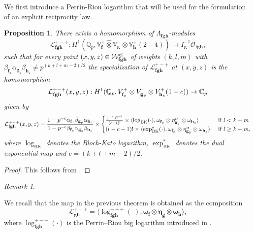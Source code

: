 \documentclass[a4paper,11pt]{amsart}
\theoremstyle{plain}
\newtheorem{propo}[theorem]{Proposition}
\theoremstyle{definition}
\theoremstyle{remark}
\newtheorem{remarkwr}[theorem]{Remark}
\newenvironment{remark}{\begin{remarkwr}\begin{upshape}}{\end{upshape}\end{remarkwr}}
\newcommand{\bb}{\mathbb}
\newcommand{\cl}{\mathcal}
\DeclareMathOperator{\BK}{BK}
\newcommand{\hf}{{\mathbf{f}}}
\newcommand{\hg}{{\mathbf{g}}}
\newcommand{\hh}{{\mathbf h}}
\numberwithin{equation}{section}
\begin{document}
We first introduce a Perrin-Riou logarithm that will be used for the formulation of an explicit reciprocity law. 

\begin{propo}\label{perrin2}
There exists a
homomorphism of $\Lambda_{\hf \hg \hh}$-modules
\[
\mathcal L_{\hf \hg \hh}^{+-+}: H^1(\mathbb Q_p, \bb{V}_\hf^+ \hat{\otimes}\mathbb V_{\hg}^- \hat \otimes \mathbb V_{\hh}^+ (2-\mathbf{t})) \rightarrow I_\hg^{-1} \cl{O}_{\hf \hg \hh },
\]
such that for every point $(x,y,z) \in \mathcal W_{{\bf fgh}}^{\mathrm{cl}}$ of weights $(k,l,m)$ with $\beta_{\hf_x}\alpha_{\hg_y}\beta_{\hh_z}\neq p^{(k+l+m-2)/2}$ the specialization of $\mathcal L_{\hf \hg \hh}^{+-+}$ at $(x,y,z)$ is the homomorphism
\[
\mathcal L_{{\bf fgh}}^{+-+}(x,y,z): H^1(\mathbb Q_p, V_{\hf_x}^+\otimes V_{\hg_y}^- \otimes V_{\hh_z}^+(1-c)) \rightarrow \mathbb C_p
\]
given by
\[
\mathcal L_{{\bf fgh}}^{+-+}(x,y,z) = \frac{1-p^{-c}\alpha_{\hf_x} \beta_{\hg_y}\alpha_{\hh_z}}{1-p^{-c} \beta_{\hf_x} \alpha_{\hg_y} \beta_{\hh_z}} \times \begin{cases} \frac{(-1)^{c-l}}{(c-l)!} \times \langle \log_{\BK}(\cdot), \omega_{\hf_x}\otimes\eta_{\hg_y}^\alpha \otimes \omega_{\hh_z} \rangle & \text{ if } l < k+ m \\ (l-c-1)! \times \langle \exp_{\BK}^*(\cdot), \omega_{\hf_x} \otimes\eta_{\hg_y}^\alpha \otimes \omega_{\hh_z} \rangle & \text{ if } l \geq k+m, \end{cases}
\]
where $\log_{\BK}$ denotes the Bloch-Kato logarithm, $\exp_{\BK}^*$ denotes the dual exponential map and $c=(k+l+m-2)/2$.
\end{propo}
\begin{proof}
This follows from \cite[Proposition~7.3]{BSV}.
\end{proof}


\begin{remark}
    We recall that the map in the previous theorem is obtained as the composition
    \[
    \mathcal L_{\hg \hh}^{+-+} = \langle \log_{\hf \hg \hh}^{+-+}(\cdot), \bm{\omega}_{\hf}\otimes\bm{\eta}_{\hg} \otimes \bm{\omega}_{\hh} \rangle,
    \]
    where $\log_{\hf \hg \hh}^{+-+}(\cdot)$ is the Perrin--Riou big logarithm introduced in \cite[Proposition~7.1]{BSV}. %
\end{remark}
\end{document}

